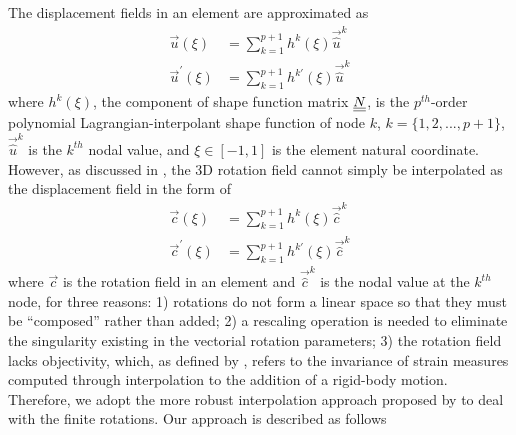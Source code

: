 The displacement fields in an element are approximated as
\begin{align}
    \label{InterpolateDisp}
    \vec{u}(\xi) &= \sum_{k=1}^{p+1} h^k(\xi) \vec{\hat{u}}^k \\
    \label{InterpolateDispp}
    \vec{u}^\prime(\xi) &= \sum_{k=1}^{p+1} h^{k\prime}(\xi) \vec{\hat{u}}^k
\end{align}
where $h^k(\xi)$, the component of shape function matrix $\underline{\underline{N}}$, is the $p^{th}$-order polynomial
Lagrangian-interpolant shape function of node $k$, $k=\{1,2,...,p+1\}$, 
$\vec{\hat{u}}^k$ is
the $k^{th}$ nodal value, and $\xi \in \left[-1,1\right]$ is the element
natural coordinate.
However, as discussed in \cite{Bauchau-etal:2008}, the 
3D rotation field cannot simply be interpolated as the displacement field in the form of
\begin{align}
    \label{InterpolateRot}
    \vec{c}(\xi) &= \sum_{k=1}^{p+1} h^k(\xi) \vec{\hat{c}}^k \\
    \label{InterpolateRotp}
    \vec{c}^\prime(\xi) &= \sum_{k=1}^{p+1} h^{k \prime}(\xi) \vec{\hat{c}}^k 
\end{align}    
where $\vec{c}$ is the rotation field in an element and $\vec{\hat{c}}^k$ is
the nodal value at the $k^{th}$ node, for three reasons: 1) rotations do not
form a linear space so that they must be  ``composed'' rather than added; 2)
a rescaling operation is needed to eliminate the singularity existing in the
vectorial rotation parameters; 3) the rotation field lacks objectivity,
which, as
defined by \cite{Crisfield1999}, refers to the
invariance of strain measures computed through interpolation to the addition
of a rigid-body motion. Therefore, we adopt the more robust interpolation
approach proposed by \cite{Crisfield1999} to deal
with the finite rotations. Our approach is described as follows
